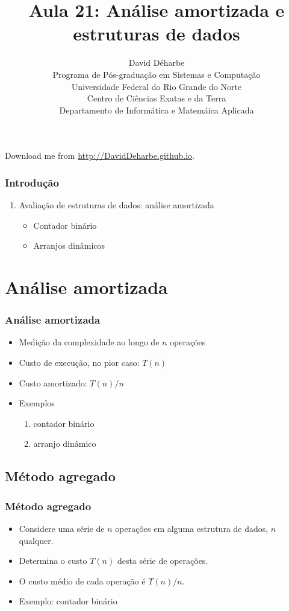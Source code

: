 \documentclass{beamer}
\title{Aula 21: Análise amortizada e estruturas de dados}
\author{David Déharbe \\
  Programa de Pós-graduação em Sistemas e Computação \\
  Universidade Federal do Rio Grande do Norte \\
  Centro de Ciências Exatas e da Terra \\
  Departamento de Informática e Matemáica Aplicada}
\date{}
\begin{document}

\begin{frame}
  \titlepage
  Download me from \url{http://DavidDeharbe.github.io}.
\end{frame}

\begin{frame}
  \frametitle{Introdução}
  \tableofcontents

  \begin{enumerate}
    \item Avaliação de estruturas de dados: análise amortizada
      \begin{itemize}
        \item Contador binário
        \item Arranjos dinâmicos
      \end{itemize}
  \end{enumerate}

\end{frame}

\section{Análise amortizada}

\begin{frame}
\frametitle{Análise amortizada}

\begin{itemize}
\item Medição da complexidade ao longo de $n$ operações
\item Custo de execução, no pior caso: $T(n)$
\item Custo amortizado: $T(n)/n$
\item Exemplos
\begin{enumerate}
  \item contador binário
  \item arranjo dinâmico
\end{enumerate}
\end{itemize}
\end{frame}

\subsection{Método agregado}

\begin{frame}

\frametitle{Método agregado}

\begin{itemize}
\item Considere uma série de $n$ operações em alguma estrutura de dados, $n$
  qualquer.

\item Determina o custo $T(n)$ desta série de operações.

\item O custo médio de cada operação é $T(n)/n$.

\item Exemplo: contador binário
\end{itemize}

\end{frame}
\end{document}
